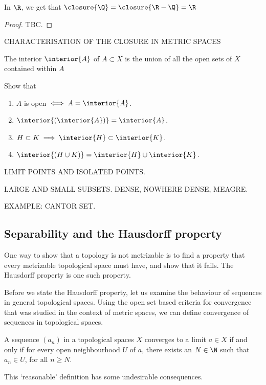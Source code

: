 \begin{ncor}
  In $\R$, we get that $\closure{\Q} = \closure{\R-\Q} = \R$
\end{ncor}
\begin{proof}
  TBC.
\end{proof}

CHARACTERISATION OF THE CLOSURE IN METRIC SPACES

\begin{ndfn}
  The interior $\interior{A}$ of $A \subset X$ is the union of all the open sets of $X$ contained within $A$
\end{ndfn}

\begin{exercise}
Show that
\begin{enumerate}
\item $A$ is open $\iff A = \interior{A}$.
\item $\interior{(\interior{A})} = \interior{A}$.
\item $H \subset K \implies \interior{H} \subset \interior{K}$.
\item $\interior{(H \cup K)} = \interior{H} \cup \interior{K}$.
\end{enumerate}
\end{exercise}


LIMIT POINTS AND ISOLATED POINTS.

LARGE AND SMALL SUBSETS. DENSE, NOWHERE DENSE, MEAGRE.

EXAMPLE: CANTOR SET.

\subsection{Separability and the Hausdorff property}
One way to show that a topology is not metrizable is to find a property that every metrizable topological space must have, and show that it fails. The Hausdorff property is one such property.

Before we state the Hausdorff property, let us examine the behaviour of sequences in general topological spaces. Using the open set based criteria for convergence that was studied in the context of metric spaces, we can define convergence of sequences in topological spaces.
\begin{ndfn}
  A sequence $(a_n)$ in a topological spaces $X$ converges to a limit $a \in X$ if and only if for every open neighbourhood $U$ of $a$, there exists an $N \in \N$ such that $a_n \in U$, for all $n \geq N$.
\end{ndfn}
This `reasonable' definition has some undesirable consequences.

